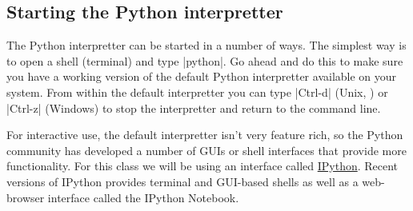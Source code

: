 
\subsection{Starting the Python interpretter}

The Python interpretter can be started in a number of ways. The simplest
way is to open a shell (terminal) and type |python|. Go ahead and do
this to make sure you have a working version of the default Python
interpretter available on your system. From within the default
interpretter you can type |Ctrl-d| (Unix, \OSX) or
|Ctrl-z| (Windows) to stop the interpretter and return to the
command line.

For interactive use, the default interpretter isn't very feature rich,
so the Python community has developed a number of GUIs or shell
interfaces that provide more functionality. For this class we will be
using an interface called \href{http://ipython.org/}{IPython}. Recent versions of IPython provides terminal and GUI-based shells as well as a web-browser interface called the IPython Notebook. 



